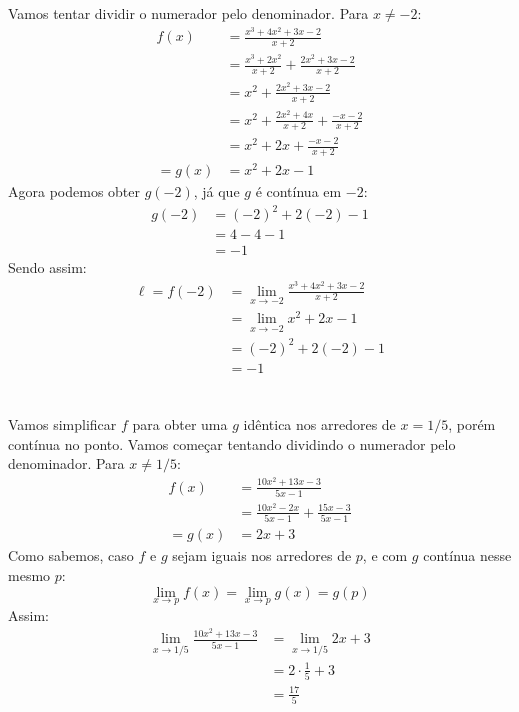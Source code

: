 \documentclass[12pt]{article}
\begin{document}
Vamos tentar dividir o numerador pelo denominador. Para \(x \ne -2\):
\begin{align*}
	f(x) &= \frac{x^3 + 4x^2 + 3x - 2}{x+2} \\
	&= \frac{x^3 + 2x^2}{x+2} + \frac{2x^2 + 3x - 2}{x+2} \\
	&= x^2 + \frac{2x^2 + 3x - 2}{x+2} \\
	&= x^2 + \frac{2x^2 + 4x}{x+2} + \frac{-x-2}{x+2} \\
	&= x^2 + 2x + \frac{-x-2}{x+2} \\
	= g(x)
	&= x^2 + 2x - 1
\end{align*}
Agora podemos obter \(g(-2)\), já que \(g\) é contínua em \(-2\):
\begin{align*}
	g(-2) 
	&= {(-2)}^2 + 2(-2) -1 \\
	&= 4 - 4 - 1 \\
	&= -1
\end{align*}
Sendo assim:
\begin{align*}
	\ell = f(-2)
	&= \lim_{x\rightarrow -2} \frac{x^3 + 4x^2 + 3x - 2}{x+2} \\
	&= \lim_{x\rightarrow -2} x^2 + 2x - 1 \\
	&= {(-2)}^2 + 2(-2) -1 \\
	&= -1
\end{align*}
\section{}
\subsection{}
Vamos simplificar \(f\) para obter uma \(g\) idêntica nos arredores de \(x=1/5\), porém contínua no ponto.
Vamos começar tentando dividindo o numerador pelo denominador. Para \(x \ne 1/5\):
\begin{align*}
	f(x)
	&= \frac{10x^2 + 13x - 3}{5x-1} \\
	&= \frac{10x^2 - 2x}{5x - 1} + \frac{15x - 3}{5x-1} \\
	= g(x)
	&= 2x + 3
\end{align*}
Como sabemos, caso \(f\) e \(g\) sejam iguais nos arredores de \(p\), e com \(g\) contínua nesse mesmo \(p\):
\[
	\lim_{x\rightarrow p} f(x) = \lim_{x\rightarrow p} g(x) = g(p)
\]
Assim:
\begin{align*}
	\lim_{x\rightarrow 1/5} \frac{10x^2 + 13x - 3}{5x-1} 
	&= \lim_{x\rightarrow 1/5} 2x + 3\\
	&= 2\cdot \frac{1}{5} + 3 \\
	&= \frac{17}{5}
\end{align*}
\end{document}
